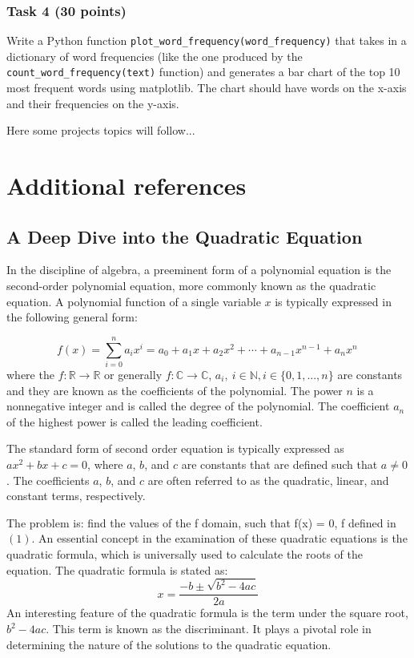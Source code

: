 \documentclass[12pt]{article}
\begin{document}
\subsubsection{Task 4 (30 points)}
Write a Python function \texttt{plot\_word\_frequency(word\_frequency)} that takes in a dictionary of word frequencies (like the one produced by the \texttt{count\_word\_frequency(text)} function) and generates a bar chart of the top 10 most frequent words using matplotlib. The chart should have words on the x-axis and their frequencies on the y-axis.


\newpage
Here some projects topics will follow...
\newpage



\section{Additional references}

\subsection{A Deep Dive into the Quadratic Equation}

In the discipline of algebra, a preeminent form of a polynomial equation is the second-order polynomial equation, more commonly known as the quadratic equation. A polynomial function of a single variable $x$ is typically expressed in the following general form:

\begin{equation}
f(x) = \sum_{i=0}^{n} a_ix^i = a_0 + a_1x + a_2x^2 + \cdots + a_{n-1}x^{n-1} + a_nx^n \,
\end{equation}
where the $f: \mathbb{R} \rightarrow \mathbb{R}$ or generally $f: \mathbb{C} \rightarrow \mathbb{C}$, $a_i, \ i \in \mathbb{N}, i \in \{0, 1, ..., n \}$ are constants and they are known as the coefficients of the polynomial. The power $n$ is a nonnegative integer and is called the degree of the polynomial. The coefficient $a_n$ of the highest power is called the leading coefficient.

 The standard form of second order equation is typically expressed as $ax^2 + bx + c = 0$, where $a$, $b$, and $c$ are constants that are defined such that $a \neq 0$. The coefficients $a$, $b$, and $c$ are often referred to as the quadratic, linear, and constant terms, respectively. 

The problem is: find the values of the f domain, such that f(x) = 0, f defined in $(1)$. An essential concept in the examination of these quadratic equations is the quadratic formula, which is universally used to calculate the roots of the equation. The quadratic formula is stated as:
\begin{equation}
x = \frac{-b \pm \sqrt{b^2 - 4ac}}{2a}
\end{equation}
An interesting feature of the quadratic formula is the term under the square root, $b^2 - 4ac$. This term is known as the discriminant. It plays a pivotal role in determining the nature of the solutions to the quadratic equation.
\end{document}
